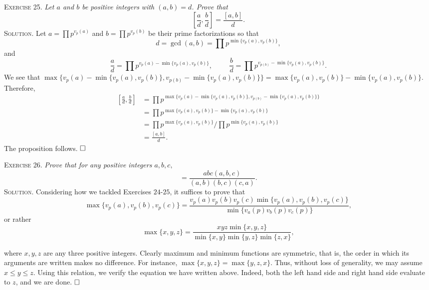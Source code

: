 \documentclass[11pt, leqno]{article}
\newcommand{\done}{\ensuremath{\hfill\square}}
\begin{document}
\textsc{Exercise 25}. \emph{Let $a$ and $b$ be positive integers with $(a,b) = d$. Prove that 
\begin{displaymath}
\left[ \frac{a}{d}, \frac{b}{d} \right] = \frac{[a,b]}{d}.
\end{displaymath}}\textsc{Solution}. Let $a = \prod p^{v_p(a)}$ and $b = \prod p^{v_p(b)}$ be their prime factorizations so that 
\begin{displaymath}
d = \gcd(a, b) = \prod p^{\min\{v_p(a), v_p(b)\}},
\end{displaymath}
and
\begin{displaymath}
\frac{a}{d} = \prod p^{v_p(a) - \min\{v_p(a), v_p(b)\}}, \hspace{1cm} \frac{b}{d} = \prod p^{v_{p(b)} - \min\{v_p(a), v_p(b)\}}.
\end{displaymath}
We see that $\max\{ v_p(a) -\min\{v_p(a), v_p(b)\}, v_{p(b)} - \min\{v_p(a), v_p(b)\} \} = \max\{ v_p(a), v_p(b) \} - \min\{v_p(a), v_p(b)\}$. Therefore, 
\begin{align*}
  \left[ \frac{a}{d}, \frac{b}{d} \right] &= \prod p^{\max\{ v_p(a) -\min\{v_p(a), v_p(b)\}, v_{p(b)} - \min\{v_p(a), v_p(b)\} \}} \\
                                          &= \prod p^{\max\{ v_p(a), v_p(b) \} - \min\{v_p(a), v_p(b)\}} \\
  &= \prod p^{\max\{ v_p(a), v_p(b) \}} / \prod p^{\min\{v_p(a), v_p(b)\}} \\
  &= \frac{[a,b]}{d}.
\end{align*}
The proposition follows. \done

\textsc{Exercise 26}. \emph{Prove that for any positive integers $a, b, c,$ 
\begin{displaymath}
[a, b, c] = \frac{abc(a,b,c)}{(a,b)(b,c)(c,a)}.
\end{displaymath}}\textsc{Solution}. Considering how we tackled Exercises $24$-$25$, it suffices to prove that
\begin{displaymath}
\max\{ v_p(a), v_p(b), v_p(c) \} = \frac{v_p(a)v_p(b)v_p(c)  \min\{ v_p(a), v_p(b), v_p(c) \}}{\min\{ v_a(p) v_b(p) v_c(p)  \}},
\end{displaymath}
or rather 
\begin{displaymath}
\max\{x, y, z\} = \frac{xyz \min\{ x, y, z \}}{ \min\{ x, y \} \min\{ y, z \}\min\{ z, x \}},
\end{displaymath}

where $x,y,z$ are any three positive integers. Clearly maximum and minimum functions are symmetric, that is, the order in which its arguments are written makes no difference. For instance, $\max\{ x,y,z \} = \max\{ y,z,x \}$. Thus, without loss of generality, we may assume $x \leq y \leq z$. Using this relation, we verify the equation we have written above. Indeed, both the left hand side and right hand side evaluate to $z$, and we are done. \done
\end{document}
